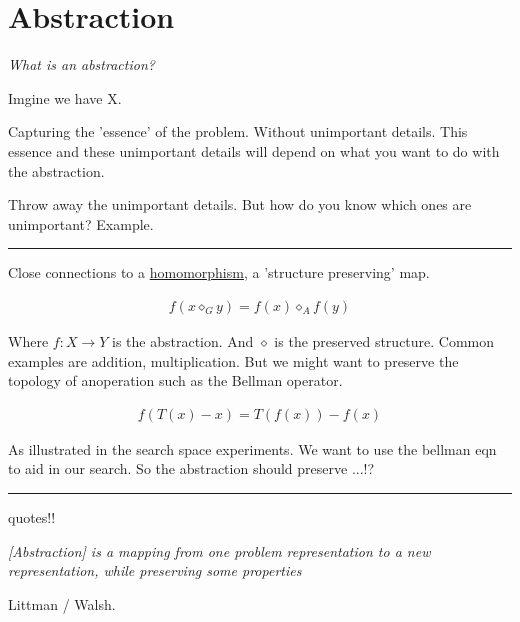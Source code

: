 \chapter{Abstraction}\label{C:abstraction}


\begin{displayquote}
 \textit{What is an abstraction?}
\end{displayquote}

Imgine we have X.

Capturing the 'essence' of the problem. Without unimportant details.
This essence and these unimportant details will depend on what you want to do with the abstraction.

Throw away the unimportant details. But how do you know which ones are unimportant?
Example.

\begin{center}\rule{0.5\linewidth}{\linethickness}\end{center}

Close connections to a \href{https://en.wikipedia.org/wiki/Homomorphism}{homomorphism}, a 'structure preserving' map.

\begin{align*}
f(x \diamond_G y) = f(x) \diamond_A f(y)
\end{align*}

Where $f: X\to Y$ is the abstraction. And $\diamond$ is the preserved structure.
Common examples are addition, multiplication. But we might want to preserve the topology of anoperation such as the Bellman operator.

\begin{align*}
f(T(x) - x) = T(f(x)) - f(x)
\end{align*}

As illustrated in the search space experiments. We want to use the bellman eqn to aid in our search.
So the abstraction should preserve ...!?


\begin{center}\rule{0.5\linewidth}{\linethickness}\end{center}

{\color{red}quotes!!}
\begin{displayquote}
  \textit{[Abstraction] is a mapping from one problem representation to a new representation, while preserving some properties}
\end{displayquote} Littman / Walsh.

